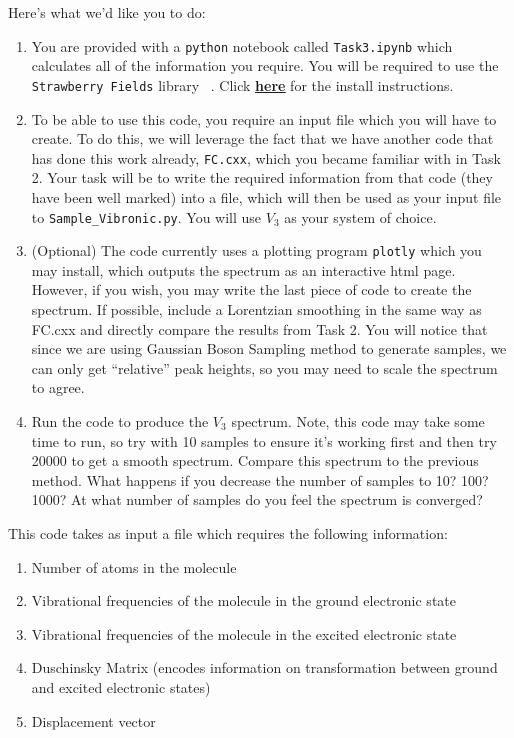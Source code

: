 \documentclass[12pt]{article}
\begin{document}
Here's what we'd like you to do:
\begin{enumerate}
\item You are provided with a \texttt{python} notebook called \texttt{Task3.ipynb} which calculates all of the information you require. You will be required to use the \texttt{Strawberry Fields} library ~\cite{killoran2019strawberry,bromley2020applications}. Click  \href{https://strawberryfields.readthedocs.io/en/stable/_static/install.html}{\underline{\textbf{here}}} for the install instructions.
    \item To be able to use this code, you require an input file which you will have to create. To do this, we will leverage the fact that we have another code that has done this work already, \texttt{FC.cxx}, which you became familiar with in Task 2.  Your task will be to write the required information from that code (they have been well marked) into a file, which will then be used as your input file to \texttt{Sample\_Vibronic.py}. You will use $V_3$ as your system of choice.
     \item (Optional) The code currently uses a plotting program \texttt{plotly} which you may install, which outputs the spectrum as an interactive html page. However, if you wish, you may write the last piece of code to create the spectrum. If possible, include a Lorentzian smoothing in the same way as FC.cxx and directly compare the results from Task 2. You will notice that since we are using Gaussian Boson Sampling method to generate samples, we can only get ``relative'' peak heights, so you may need to scale the spectrum to agree.
     \item Run the code to produce the $V_3$ spectrum. Note, this code may take some time to run, so try with 10 samples to ensure it's working first and then try 20000 to get a smooth spectrum. Compare this spectrum to the previous method. What happens if you decrease the number of samples to 10? 100? 1000? At what number of samples do you feel the spectrum is converged?
\end{enumerate}

\noindent This code takes as input a file which requires the following information:
\begin{enumerate}
    \item Number of atoms in the molecule
    \item Vibrational frequencies of the molecule in the ground electronic state
    \item Vibrational frequencies of the molecule in the excited electronic state
    \item Duschinsky Matrix (encodes information on transformation between ground and excited electronic states)
    \item Displacement vector
\end{enumerate}
\end{document}
